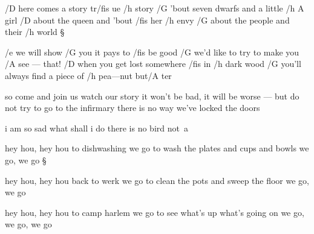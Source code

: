 


/D here comes a story tr/fis ue /h story
/G 'bout seven dwarfs and a little /{h A} girl
/D about the queen and 'bout /fis her /h envy
/G about the people and their /h world \S

/e we will show /G you it pays to /fis be good
/G we'd like to try to make you /A see --- that!
/D when you get lost somewhere /fis in /h dark wood
/G you'll always find a piece of /h pea---nut but/A ter \s

so come and join us watch our story
it won't be bad, it will be worse --- but do not
try to go to the infirmary
there is no way we've locked the doors 


i am so sad
what shall i do
there is no bird
\hbox{not a 
      }


hey hou, hey hou
to dishwashing we go
to wash the plates and cups and bowls
we go, we go \S

hey hou, hey hou
back to werk we go
to clean the pots and sweep the floor
we go, we go \s

hey hou, hey hou
to camp harlem we go
to see what's up what's going on
we go, we go, we go

\bye
